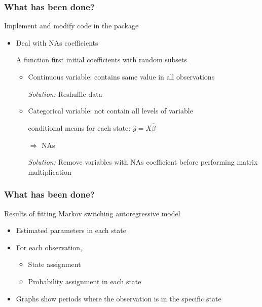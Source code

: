 \documentclass{beamer}
\begin{document}
\begin{frame}
\frametitle{What has been done?}
Implement and modify code in the package
\begin{itemize}
	\item Deal with NAs coefficients
	
	A function first initial coefficients with random subsets
	
	\begin{itemize}	
		\item Continuous variable: contains same value in all observations
		
		\vspace{2pt}
		
		\textit{Solution:} Reshuffle data
		
		\vspace{5pt}
		
		\item Categorical variable: not contain all levels of variable
		
		\vspace{2pt}
		
		conditional means for each state: $\hat{y} = X \hat{\beta}$
		
		$\Rightarrow$ NAs
		
		\vspace{2pt}
		
		\textit{Solution:} Remove variables with NAs coefficient before performing matrix multiplication
	\end{itemize}
\end{itemize}
\end{frame}

\begin{frame}
\frametitle{What has been done?}
Results of fitting Markov switching autoregressive model
\begin{itemize}
	\setlength\itemsep{1em}
	\item Estimated parameters in each state
	\item For each observation,
	\begin{itemize}
		\item State assignment
		\vspace{5pt}
		
		\item Probability assignment in each state
	\end{itemize}
	
	\item Graphs show periods where the observation is in the specific state
\end{itemize}

\end{frame}
\end{document}
